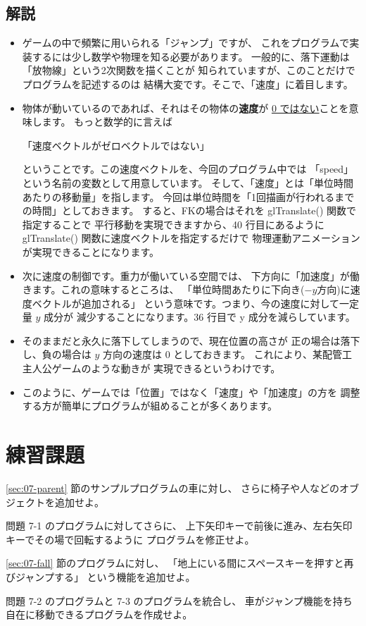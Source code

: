 \subsection*{解説}
\begin{itemize}
 \item ゲームの中で頻繁に用いられる「ジャンプ」ですが、
	これをプログラムで実装するには少し数学や物理を知る必要があります。
	一般的に、落下運動は「放物線」という2次関数を描くことが
	知られていますが、このことだけでプログラムを記述するのは
	結構大変です。そこで、「速度」に着目します。

 \item 物体が動いているのであれば、それはその物体の\textbf{速度}が
	\underline{0 ではない}ことを意味します。
	もっと数学的に言えば
	\begin{center}
	「速度ベクトルがゼロベクトルではない」
	\end{center}
	ということです。この速度ベクトルを、今回のプログラム中では
	「speed」という名前の変数として用意しています。
	そして、「速度」とは「単位時間あたりの移動量」を指します。
	今回は単位時間を「1回描画が行われるまでの時間」としておきます。
	すると、FKの場合はそれを glTranslate() 関数で指定することで
	平行移動を実現できますから、40 行目にあるように
	glTranslate() 関数に速度ベクトルを指定するだけで
	物理運動アニメーションが実現できることになります。

 \item 次に速度の制御です。重力が働いている空間では、
	下方向に「加速度」が働きます。これの意味するところは、
	「単位時間あたりに下向き(\(-y\)方向)に速度ベクトルが追加される」
	という意味です。つまり、今の速度に対して一定量 \(y\) 成分が
	減少することになります。36 行目で y 成分を減らしています。

 \item そのままだと永久に落下してしまうので、現在位置の高さが
	正の場合は落下し、負の場合は \(y\) 方向の速度は 0 としておきます。
	これにより、某配管工主人公ゲームのような動きが
	実現できるというわけです。

 \item このように、ゲームでは「位置」ではなく「速度」や「加速度」の方を
	調整する方が簡単にプログラムが組めることが多くあります。
	
\end{itemize}

\section{練習課題} \label{sec:07-q}
\begin{description}
 \myitem \ref{sec:07-parent} 節のサンプルプログラムの車に対し、
	さらに椅子や人などのオブジェクトを追加せよ。

 \myitem 問題 7-1 のプログラムに対してさらに、
	上下矢印キーで前後に進み、左右矢印キーでその場で回転するように
	プログラムを修正せよ。

 \myitem \ref{sec:07-fall} 節のプログラムに対し、
	「地上にいる間にスペースキーを押すと再びジャンプする」
	という機能を追加せよ。

 \myitem 問題 7-2 のプログラムと 7-3 のプログラムを統合し、
	車がジャンプ機能を持ち自在に移動できるプログラムを作成せよ。

\end{description}
